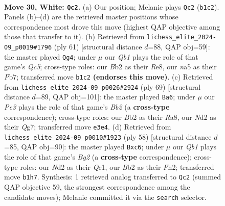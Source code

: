 \documentclass[11pt]{article}
\begin{document}
\clearpage

\begin{figure}[p]\centering
\begin{subfigure}{0.46\textwidth}\centering
\resizebox{\linewidth}{!}{%
\newchessgame
\chessboard[
  setfen={r3k2r/p3b1pp/8/n2p4/p2P2qP/4P1P1/1B1N2K1/1QR5 w - - 2 30},
  showmover=false,
  pgfstyle=straightmove, color=movearrow, markmove={b1-c2}
]}
\caption{}
\end{subfigure}\hfill
\begin{subfigure}{0.46\textwidth}\centering
\resizebox{\linewidth}{!}{%
\newchessgame
\chessboard[
  setfen={4rk2/1p3p1p/p2pbQ2/4p3/2q5/6P1/5P1P/2B2RK1 b - - 2 31},
  showmover=false,
  pgfstyle=straightmove, color=movearrow, markmove={c4-g4}
]}
\caption{}
\end{subfigure}
\\[4pt]
\begin{subfigure}{0.46\textwidth}\centering
\resizebox{\linewidth}{!}{%
\newchessgame
\chessboard[
  setfen={r7/1b4qk/1p6/pQ5p/4Pp2/5P1P/2P1N1P1/5RK1 b - - 0 35},
  showmover=false,
  pgfstyle=straightmove, color=movearrow, markmove={b7-a6}
]}
\caption{}
\end{subfigure}\hfill
\begin{subfigure}{0.46\textwidth}\centering
\resizebox{\linewidth}{!}{%
\newchessgame
\chessboard[
  setfen={1k1r4/p1p3pp/2p5/1b3p2/1P6/3P2P1/4qPBP/1RQ3K1 w - - 0 30},
  showmover=false,
  pgfstyle=straightmove, color=movearrow, markmove={g2-c6}
]}
\caption{}
\end{subfigure}
\caption{\textbf{Move 30, White: \texttt{Qc2}.} (a) Our position; Melanie plays \texttt{Qc2} (\texttt{b1c2}). Panels (b)--(d) are the retrieved master positions whose correspondence most drove this move (highest QAP objective among those that transfer to it). (b) Retrieved from \texttt{lichess\_elite\_2024-09\_p0019\#1796} (ply 61) [structural distance $d$=88, QAP obj=59]: the master played \texttt{Qg4}; under $\mu$ our \emph{Qb1} plays the role of that game's \emph{Qc5}; cross-type roles: our \emph{B}b2 as their \emph{R}e8, our \emph{n}a5 as their \emph{P}b7; transferred move \texttt{b1c2} \textbf{(endorses this move)}. (c) Retrieved from \texttt{lichess\_elite\_2024-09\_p0026\#2924} (ply 69) [structural distance $d$=89, QAP obj=101]: the master played \texttt{Ba6}; under $\mu$ our \emph{Pe3} plays the role of that game's \emph{Bb2} (a \textbf{cross-type} correspondence); cross-type roles: our \emph{B}b2 as their \emph{R}a8, our \emph{N}d2 as their \emph{Q}g7; transferred move \texttt{e3e4}. (d) Retrieved from \texttt{lichess\_elite\_2024-09\_p0010\#1923} (ply 58) [structural distance $d$=85, QAP obj=90]: the master played \texttt{Bxc6}; under $\mu$ our \emph{Qb1} plays the role of that game's \emph{Bg2} (a \textbf{cross-type} correspondence); cross-type roles: our \emph{N}d2 as their \emph{Q}c1, our \emph{B}b2 as their \emph{P}h2; transferred move \texttt{b1h7}. Synthesis: 1 retrieved analog transferred to \texttt{Qc2} (summed QAP objective 59, the strongest correspondence among the candidate moves); Melanie committed it via the \texttt{search} selector.}
\label{fig:thought-m58}
\end{figure}
\end{document}
